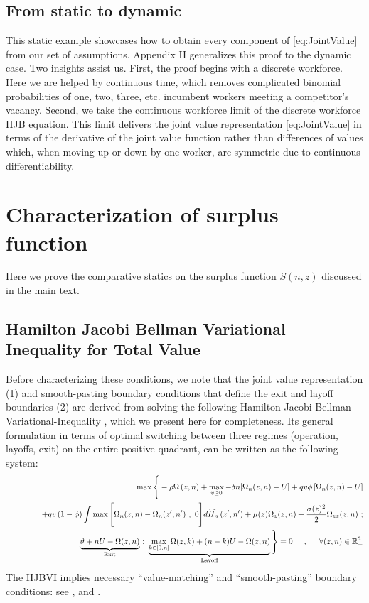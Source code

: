 \subsection{From static to dynamic}
This static example showcases how to obtain every component of \eqref{eq:JointValue} from our set of assumptions.
Appendix II generalizes this proof to the dynamic case.
Two insights assist us.
First, the proof begins with a discrete workforce.
Here we are helped by continuous time, which removes complicated binomial probabilities of one, two, three, etc. incumbent workers meeting a competitor's vacancy.
Second, we take the continuous workforce limit of the discrete workforce HJB equation.
This limit delivers the joint value representation \eqref{eq:JointValue} in terms of the derivative of the joint value function rather than differences of values which, when moving up or down by one worker, are symmetric due to continuous differentiability.

\section{Characterization of surplus function}
\label{appx:S_characterization}

Here we prove the comparative statics on the surplus function $S(n,z)$ discussed in the main text.

\subsection{Hamilton Jacobi Bellman Variational Inequality for Total Value \label{appx:HJBVI}}
Before characterizing these conditions, we note that the joint value representation (1) and smooth-pasting boundary conditions that define the exit and layoff boundaries (2) are derived from solving the following Hamilton-Jacobi-Bellman-Variational-Inequality \citep[see][]{pham2009}, which we present here for completeness.
Its general formulation in terms of optimal switching between three regimes (operation, layoffs, exit)
on the entire positive quadrant, can be written as the following system:
\begin{eqnarray}\label{eq:AppHJBVI}
&& \max \Bigg\{ - \rho \Omega \left(z,n\right) + \max_{v \geq 0} -\delta n
[\Omega_n(z,n) - U] +q v \phi \left[ \Omega_n(z,n) -U \right] \\
&& \hskip1.2cm +q v \left( 1-\phi \right) \int \max\Bigg[\Omega_n(z,n) -
\Omega_n(z^{\prime},n^{\prime}) \ , \ 0 \Bigg]d\widetilde{H_n}\left(
z^{\prime},n^{\prime}\right) +\mu(z) \Omega_z(z,n) + \frac{\sigma(z)^2}{2}
\Omega_{zz}(z,n) \ ; \notag\\
&& \hskip1.3cm \underbrace{\vartheta + n U - \Omega(z,n)}_{\text{Exit}} \ ; \
\underbrace{\max_{k \in [0,n]}
\Omega(z,k) + (n-k) U - \Omega(z,n)}_{\text{Layoff}} \Bigg\} = 0 \hskip5mm , \hskip5mm
\forall (z,n) \in \mathbb{R}_+^2\notag
\end{eqnarray}
The HJBVI implies necessary ``value-matching'' and ``smooth-pasting'' boundary conditions: see \citet{brekkeoksendal1990}, \citet{peskirshiryaev2006} and \citet{stokey2009}.

